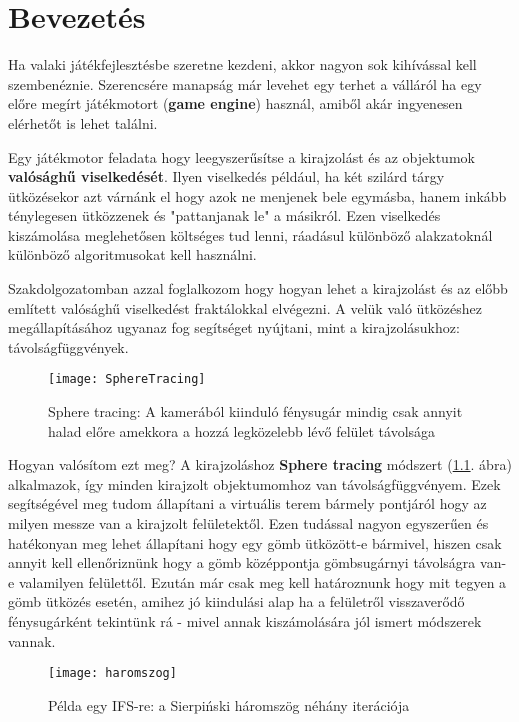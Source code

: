 \chapter{Bevezetés} %
\label{ch:intro}

Ha valaki játékfejlesztésbe szeretne kezdeni, akkor nagyon sok kihívással kell szembenéznie. Szerencsére manapság már levehet egy terhet a válláról ha egy előre megírt játékmotort (\textbf{game engine}) használ, amiből akár ingyenesen elérhetőt is lehet találni.

Egy játékmotor feladata hogy leegyszerűsítse a kirajzolást és az objektumok \textbf{valósághű viselkedését}. Ilyen viselkedés például, ha két szilárd tárgy ütközésekor azt várnánk el hogy azok ne menjenek bele egymásba, hanem inkább ténylegesen ütközzenek és "pattanjanak le" a másikról. Ezen viselkedés kiszámolása meglehetősen költséges tud lenni, ráadásul különböző alakzatoknál különböző algoritmusokat kell használni.

Szakdolgozatomban azzal foglalkozom hogy hogyan lehet a kirajzolást és az előbb említett valósághű viselkedést fraktálokkal elvégezni. A velük való ütközéshez megállapításához ugyanaz fog segítséget nyújtani, mint a kirajzolásukhoz: távolságfüggvények. 


\begin{figure}[H]
	\centering
	\texttt{[image: SphereTracing]}
	\caption{Sphere tracing: A kamerából kiinduló fénysugár mindig csak annyit halad előre amekkora a hozzá legközelebb lévő felület távolsága \cite{Raymarch94:online}}
	\label{fig:SphereTracing}
\end{figure}

Hogyan valósítom ezt meg? A kirajzoláshoz \textbf{Sphere tracing} módszert (\ref{fig:SphereTracing}. ábra) alkalmazok, így minden kirajzolt objektumomhoz van távolságfüggvényem. Ezek segítségével meg tudom állapítani a virtuális terem bármely pontjáról hogy az milyen messze van a kirajzolt felületektől. Ezen tudással nagyon egyszerűen és hatékonyan meg lehet állapítani hogy egy gömb ütközött-e bármivel, hiszen csak annyit kell ellenőriznünk hogy a gömb középpontja gömbsugárnyi távolságra van-e valamilyen felülettől. Ezután már csak meg kell határoznunk hogy mit tegyen a gömb ütközés esetén, amihez jó kiindulási alap ha a felületről visszaverődő fénysugárként tekintünk rá - mivel annak kiszámolására jól ismert módszerek vannak.

\begin{figure}[H]
	\centering
	\texttt{[image: haromszog]}
	\caption{Példa egy IFS-re: a Sierpiński háromszög néhány iterációja \cite{Sierpins37:online}}
	\label{fig:Ifs}
\end{figure}

